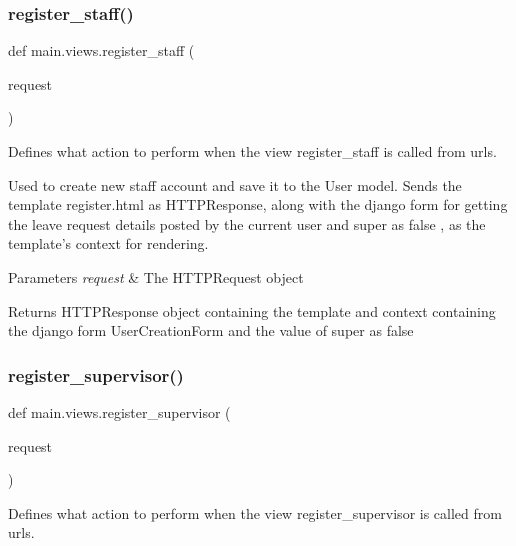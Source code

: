 \subsubsection{\texorpdfstring{register\+\_\+staff()}{register\_staff()}}
{\footnotesize\ttfamily def main.\+views.\+register\+\_\+staff (\begin{DoxyParamCaption}\item[{}]{request }\end{DoxyParamCaption})}



Defines what action to perform when the view \textquotesingle{}register\+\_\+staff\textquotesingle{} is called from urls. 

Used to create new staff account and save it to the User model. Sends the template register.\+html as H\+T\+T\+P\+Response, along with the django form for getting the leave request details posted by the current user and \textquotesingle{}super\textquotesingle{} as false , as the template’s context for rendering. 
\begin{DoxyParams}{Parameters}
{\em request} & The H\+T\+T\+P\+Request object \\
\hline
\end{DoxyParams}
\begin{DoxyReturn}{Returns}
H\+T\+T\+P\+Response object containing the template and context containing the django form User\+Creation\+Form and the value of super as false 
\end{DoxyReturn}
\mbox{\label{namespacemain_1_1views_a26d1574cf1c0681b1589baf8f2840e4a}} 
\subsubsection{\texorpdfstring{register\+\_\+supervisor()}{register\_supervisor()}}
{\footnotesize\ttfamily def main.\+views.\+register\+\_\+supervisor (\begin{DoxyParamCaption}\item[{}]{request }\end{DoxyParamCaption})}



Defines what action to perform when the view \textquotesingle{}register\+\_\+supervisor\textquotesingle{} is called from urls. 

